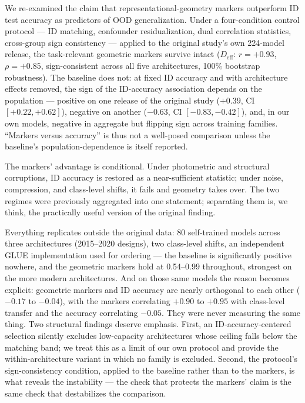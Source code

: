 \documentclass[10pt]{article} %
\begin{document}
We re-examined the claim that representational-geometry markers outperform ID test accuracy as predictors of OOD generalization. Under a four-condition control protocol --- ID matching, confounder residualization, dual correlation statistics, cross-group sign consistency --- applied to the original study's own 224-model release, the task-relevant geometric markers survive intact ($D_{\mathrm{eff}}$: $r=+0.93$, $\rho=+0.85$, sign-consistent across all five architectures, 100\% bootstrap robustness). The baseline does not: at fixed ID accuracy and with architecture effects removed, the sign of the ID-accuracy association depends on the population --- positive on one release of the original study ($+0.39$, CI $[+0.22,+0.62]$), negative on another ($-0.63$, CI $[-0.83,-0.42]$), and, in our own models, negative in aggregate but flipping sign across training families. ``Markers versus accuracy'' is thus not a well-posed comparison unless the baseline's population-dependence is itself reported.

The markers' advantage is conditional. Under photometric and structural corruptions, ID accuracy is restored as a near-sufficient statistic; under noise, compression, and class-level shifts, it fails and geometry takes over. The two regimes were previously aggregated into one statement; separating them is, we think, the practically useful version of the original finding.

Everything replicates outside the original data: 80 self-trained models across three architectures (2015--2020 designs), two class-level shifts, an independent GLUE implementation used for ordering --- the baseline is significantly positive nowhere, and the geometric markers hold at 0.54--0.99 throughout, strongest on the more modern architectures. And on those same models the reason becomes explicit: geometric markers and ID accuracy are nearly orthogonal to each other ($-0.17$ to $-0.04$), with the markers correlating $+0.90$ to $+0.95$ with class-level transfer and the accuracy correlating $-0.05$. They were never measuring the same thing. Two structural findings deserve emphasis. First, an ID-accuracy-centered selection silently excludes low-capacity architectures whose ceiling falls below the matching band; we treat this as a limit of our own protocol and provide the within-architecture variant in which no family is excluded. Second, the protocol's sign-consistency condition, applied to the baseline rather than to the markers, is what reveals the instability --- the check that protects the markers' claim is the same check that destabilizes the comparison.
\end{document}
